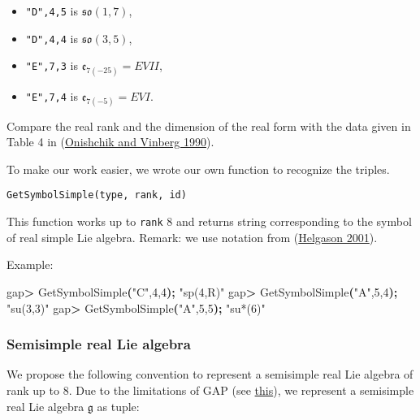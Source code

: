 \documentclass[
]{article}
\newenvironment{Shaded}{\begin{snugshade}}{\end{snugshade}}
\newcommand{\ErrorTok}[1]{\textcolor[rgb]{0.64,0.00,0.00}{\textbf{#1}}}
\newcommand{\ExtensionTok}[1]{#1}
\newcommand{\KeywordTok}[1]{\textcolor[rgb]{0.13,0.29,0.53}{\textbf{#1}}}
\newcommand{\NormalTok}[1]{#1}
\newcommand{\OperatorTok}[1]{\textcolor[rgb]{0.81,0.36,0.00}{\textbf{#1}}}
\newcommand{\StringTok}[1]{\textcolor[rgb]{0.31,0.60,0.02}{#1}}
\begin{document}
\begin{itemize}
\item
  \texttt{"D",4,5} is \(\mathfrak{so}(1,7)\),
\item
  \texttt{"D",4,4} is \(\mathfrak{so}(3,5)\),
\item
  \texttt{"E",7,3} is \(\mathfrak{e}_{7(-25)}=EVII\),
\item
  \texttt{"E",7,4} is \(\mathfrak{e}_{7(-5)}=EVI\).
\end{itemize}

Compare the real rank and the dimension of the real form with the data
given in Table 4 in (\protect\hyperlink{ref-onvin}{Onishchik and Vinberg
1990}).

To make our work easier, we wrote our own function to recognize the
triples.

\begin{verbatim}
GetSymbolSimple(type, rank, id)
\end{verbatim}

This function works up to \texttt{rank} 8 and returns string
corresponding to the symbol of real simple Lie algebra. Remark: we use
notation from (\protect\hyperlink{ref-helgason}{Helgason 2001}).

Example:

\begin{Shaded}
\begin{Highlighting}[]
\ExtensionTok{gap}\OperatorTok{\textgreater{}}\NormalTok{ GetSymbolSimple}\ErrorTok{(}\StringTok{"C"}\ExtensionTok{,4,4}\KeywordTok{);}
\StringTok{"sp(4,R)"}
\ExtensionTok{gap}\OperatorTok{\textgreater{}}\NormalTok{ GetSymbolSimple}\ErrorTok{(}\StringTok{"A"}\ExtensionTok{,5,4}\KeywordTok{);}
\StringTok{"su(3,3)"}
\ExtensionTok{gap}\OperatorTok{\textgreater{}}\NormalTok{ GetSymbolSimple}\ErrorTok{(}\StringTok{"A"}\ExtensionTok{,5,5}\KeywordTok{);}
\StringTok{"su*(6)"}
\end{Highlighting}
\end{Shaded}

\hypertarget{semisimple-real-lie-algebra}{%
\subsubsection{Semisimple real Lie
algebra}\label{semisimple-real-lie-algebra}}

We propose the following convention to represent a semisimple real Lie
algebra of rank up to 8. Due to the limitations of GAP (see
\href{https://www.gap-system.org/Faq/faq.html\#6.2}{this}), we represent
a semisimple real Lie algebra \(\mathfrak{g}\) as tuple:
\end{document}
